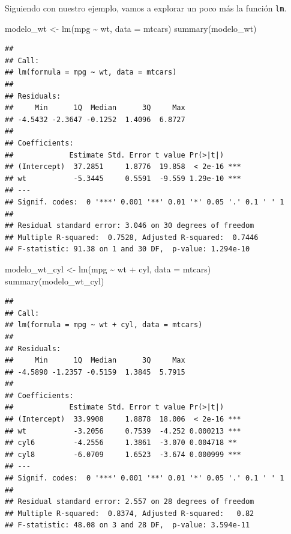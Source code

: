 \documentclass[
  12pt,
]{book}
\newenvironment{Shaded}{\begin{snugshade}}{\end{snugshade}}
\newcommand{\AttributeTok}[1]{\textcolor[rgb]{0.77,0.63,0.00}{#1}}
\newcommand{\FunctionTok}[1]{\textcolor[rgb]{0.00,0.00,0.00}{#1}}
\newcommand{\NormalTok}[1]{#1}
\newcommand{\OtherTok}[1]{\textcolor[rgb]{0.56,0.35,0.01}{#1}}
\newcommand{\SpecialCharTok}[1]{\textcolor[rgb]{0.00,0.00,0.00}{#1}}
\theoremstyle{definition}
\theoremstyle{definition}
\theoremstyle{definition}
\theoremstyle{definition}
\theoremstyle{remark}
\begin{document}
Siguiendo con nuestro ejemplo, vamos a explorar un poco más la función \texttt{lm}.

\begin{Shaded}
\begin{Highlighting}[]
\NormalTok{modelo\_wt }\OtherTok{\textless{}{-}} \FunctionTok{lm}\NormalTok{(mpg }\SpecialCharTok{\textasciitilde{}}\NormalTok{ wt, }\AttributeTok{data =}\NormalTok{ mtcars)}
\FunctionTok{summary}\NormalTok{(modelo\_wt)}
\end{Highlighting}
\end{Shaded}

\begin{verbatim}
## 
## Call:
## lm(formula = mpg ~ wt, data = mtcars)
## 
## Residuals:
##     Min      1Q  Median      3Q     Max 
## -4.5432 -2.3647 -0.1252  1.4096  6.8727 
## 
## Coefficients:
##             Estimate Std. Error t value Pr(>|t|)    
## (Intercept)  37.2851     1.8776  19.858  < 2e-16 ***
## wt           -5.3445     0.5591  -9.559 1.29e-10 ***
## ---
## Signif. codes:  0 '***' 0.001 '**' 0.01 '*' 0.05 '.' 0.1 ' ' 1
## 
## Residual standard error: 3.046 on 30 degrees of freedom
## Multiple R-squared:  0.7528, Adjusted R-squared:  0.7446 
## F-statistic: 91.38 on 1 and 30 DF,  p-value: 1.294e-10
\end{verbatim}

\begin{Shaded}
\begin{Highlighting}[]
\NormalTok{modelo\_wt\_cyl }\OtherTok{\textless{}{-}} \FunctionTok{lm}\NormalTok{(mpg }\SpecialCharTok{\textasciitilde{}}\NormalTok{ wt }\SpecialCharTok{+}\NormalTok{ cyl, }\AttributeTok{data =}\NormalTok{ mtcars)}
\FunctionTok{summary}\NormalTok{(modelo\_wt\_cyl)}
\end{Highlighting}
\end{Shaded}

\begin{verbatim}
## 
## Call:
## lm(formula = mpg ~ wt + cyl, data = mtcars)
## 
## Residuals:
##     Min      1Q  Median      3Q     Max 
## -4.5890 -1.2357 -0.5159  1.3845  5.7915 
## 
## Coefficients:
##             Estimate Std. Error t value Pr(>|t|)    
## (Intercept)  33.9908     1.8878  18.006  < 2e-16 ***
## wt           -3.2056     0.7539  -4.252 0.000213 ***
## cyl6         -4.2556     1.3861  -3.070 0.004718 ** 
## cyl8         -6.0709     1.6523  -3.674 0.000999 ***
## ---
## Signif. codes:  0 '***' 0.001 '**' 0.01 '*' 0.05 '.' 0.1 ' ' 1
## 
## Residual standard error: 2.557 on 28 degrees of freedom
## Multiple R-squared:  0.8374, Adjusted R-squared:   0.82 
## F-statistic: 48.08 on 3 and 28 DF,  p-value: 3.594e-11
\end{verbatim}
\end{document}
